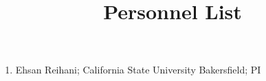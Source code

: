 \documentclass[12pt]{article}
\begin{document}
\title{Personnel List}
\author{}
\date{}
\maketitle

\begin{enumerate}
\item Ehsan Reihani; California State University Bakersfield; PI
\end{enumerate}
\end{document}
